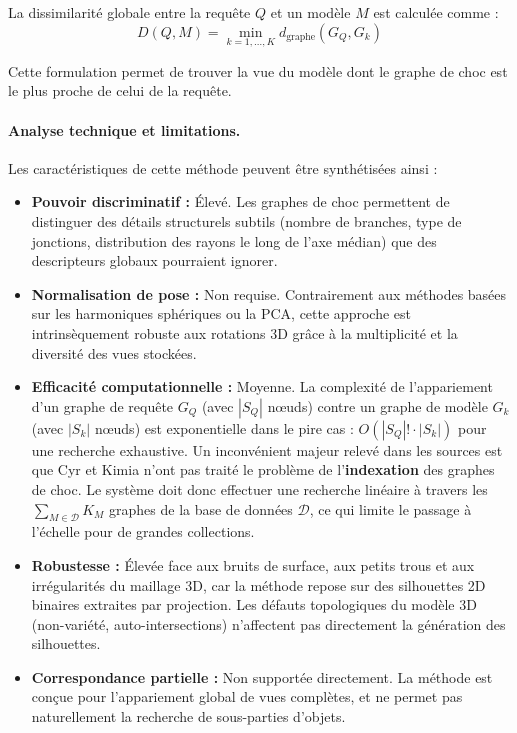 \documentclass[11pt,a4paper,oneside]{report}
\begin{document}
La dissimilarité globale entre la requête $Q$ et un modèle $M$ est calculée comme :
$$D(Q, M) = \min_{k=1,\ldots,K} d_{\text{graphe}}(G_Q, G_k)$$

Cette formulation permet de trouver la vue du modèle dont le graphe de choc est le plus proche de celui de la requête.

\paragraph{Analyse technique et limitations.}
Les caractéristiques de cette méthode peuvent être synthétisées ainsi :

\begin{itemize}
    \item \textbf{Pouvoir discriminatif :} Élevé. Les graphes de choc permettent de distinguer des détails structurels subtils (nombre de branches, type de jonctions, distribution des rayons le long de l'axe médian) que des descripteurs globaux pourraient ignorer.
    
    \item \textbf{Normalisation de pose :} Non requise. Contrairement aux méthodes basées sur les harmoniques sphériques ou la PCA, cette approche est intrinsèquement robuste aux rotations 3D grâce à la multiplicité et la diversité des vues stockées.
    
    \item \textbf{Efficacité computationnelle :} Moyenne. La complexité de l'appariement d'un graphe de requête $G_Q$ (avec $|S_Q|$ nœuds) contre un graphe de modèle $G_k$ (avec $|S_k|$ nœuds) est exponentielle dans le pire cas : $O(|S_Q|! \cdot |S_k|)$ pour une recherche exhaustive. Un inconvénient majeur relevé dans les sources est que Cyr et Kimia n'ont pas traité le problème de l'\textbf{indexation} des graphes de choc. Le système doit donc effectuer une recherche linéaire à travers les $\sum_{M \in \mathcal{D}} K_M$ graphes de la base de données $\mathcal{D}$, ce qui limite le passage à l'échelle pour de grandes collections.
    
    \item \textbf{Robustesse :} Élevée face aux bruits de surface, aux petits trous et aux irrégularités du maillage 3D, car la méthode repose sur des silhouettes 2D binaires extraites par projection. Les défauts topologiques du modèle 3D (non-variété, auto-intersections) n'affectent pas directement la génération des silhouettes.
    
    \item \textbf{Correspondance partielle :} Non supportée directement. La méthode est conçue pour l'appariement global de vues complètes, et ne permet pas naturellement la recherche de sous-parties d'objets.
\end{itemize}
\end{document}
